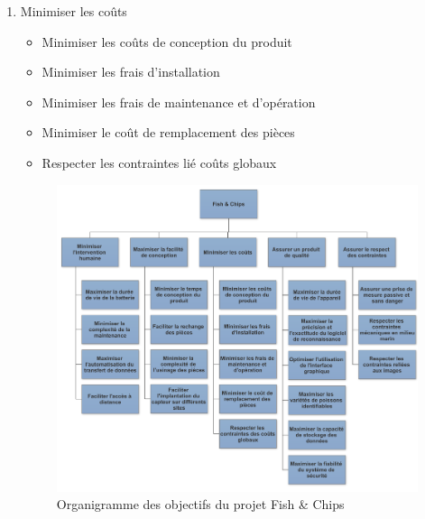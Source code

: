 \begin{enumerate}
    \item Minimiser les coûts
    \begin{itemize}
        \item Minimiser les coûts de conception du produit
        \item Minimiser les frais d'installation
        \item Minimiser les frais de maintenance et d'opération
        \item Minimiser le coût de remplacement des pièces
        \item Respecter les contraintes lié coûts globaux
    \end{itemize}
    
    \newpage
    
    \begin{figure}
        \centering
        \includegraphics[width=1.0\linewidth]{fig/Organigramme.png}
        \caption{Organigramme des objectifs du projet Fish \& Chips}
        \label{fig:organigramme}
    \end{figure}
    
    
\end{enumerate}
